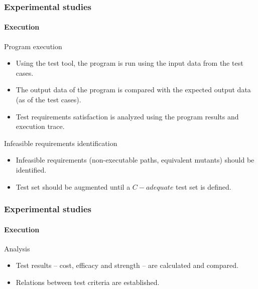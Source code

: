 \begin{frame}
\frametitle{Experimental studies}
\framesubtitle{Execution}

\begin{block:fact}{Program execution}
\begin{itemize}
	\item Using the test tool, the program is run using the input data from
	the test cases.

	\item The output data of the program is compared with the expected output
	data (as of the test cases).

	\item Test requirements satisfaction is analyzed using the program results
	and execution trace.
\end{itemize}
\end{block:fact}

\begin{block:fact}{Infeasible requirements identification}
\begin{itemize}
	\item Infeasible requirements (non-executable paths, equivalent mutants)
	should be identified.

	\item Test set should be augmented until a $C-adequate$ test set is
	defined.
\end{itemize}
\end{block:fact}
\end{frame}


\begin{frame}[hasnext=false]
\frametitle{Experimental studies}
\framesubtitle{Execution}
\label{concept:experimental-studies:analysis}

\begin{block:fact}{Analysis}
\begin{itemize}
	\item Test results -- cost, efficacy and strength -- are calculated and
	compared.

	\item Relations between test criteria are established.
\end{itemize}
\end{block:fact}

\hfill
{}
\end{frame}